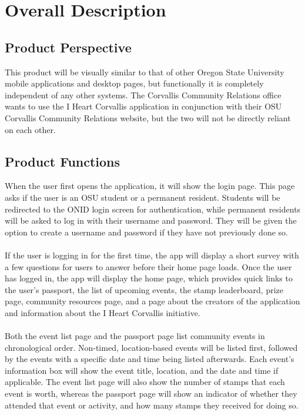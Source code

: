\documentclass[draftclsnofoot, onecolumn, 10pt, compsoc]{IEEEtran}
\begin{document}
	\section{Overall Description}
		\subsection{Product Perspective}
			This product will be visually similar to that of other Oregon State University mobile applications and desktop pages, but functionally it is completely independent of any other systems. The Corvallis Community Relations office wants to use the I Heart Corvallis application in conjunction with their OSU Corvallis Community Relations website, but the two will not be directly reliant on each other.

		\subsection{Product Functions}
			When the user first opens the application, it will show the login page. This page asks if the user is an OSU student or a permanent resident. Students will be redirected to the ONID login screen for authentication, while permanent residents will be asked to log in with their username and password. They will be given the option to create a username and password if they have not previously done so. \\ \\
			If the user is logging in for the first time, the app will display a short survey with a few questions for users to answer before their home page loads. Once the user has logged in, the app will display the home page, which provides quick links to the user's passport, the list of upcoming events, the stamp leaderboard, prize page, community resources page, and a page about the creators of the application and information about the I Heart Corvallis initiative. \\ \\
			Both the event list page and the passport page list community events in chronological order. Non-timed, location-based events will be listed first, followed by the events with a specific date and time being listed afterwards. Each event's information box will show the event title, location, and the date and time if applicable. The event list page will also show the number of stamps that each event is worth, whereas the passport page will show an indicator of whether they attended that event or activity, and how many stamps they received for doing so. \\ \\
\end{document}
